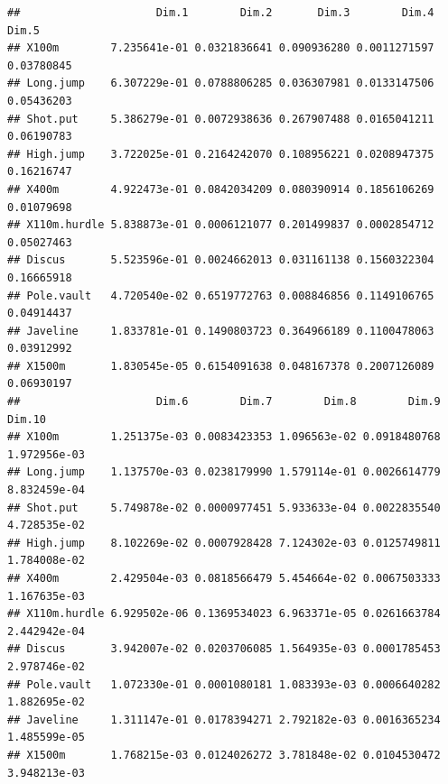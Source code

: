 \documentclass[
]{book}
\newenvironment{Shaded}{\begin{snugshade}}{\end{snugshade}}
\newcommand{\CommentTok}[1]{\textcolor[rgb]{0.56,0.35,0.01}{\textit{#1}}}
\newcommand{\FunctionTok}[1]{\textcolor[rgb]{0.13,0.29,0.53}{\textbf{#1}}}
\newcommand{\NormalTok}[1]{#1}
\newcommand{\OtherTok}[1]{\textcolor[rgb]{0.56,0.35,0.01}{#1}}
\newcommand{\SpecialCharTok}[1]{\textcolor[rgb]{0.81,0.36,0.00}{\textbf{#1}}}
\begin{document}
\begin{verbatim}
##                     Dim.1        Dim.2       Dim.3        Dim.4      Dim.5
## X100m        7.235641e-01 0.0321836641 0.090936280 0.0011271597 0.03780845
## Long.jump    6.307229e-01 0.0788806285 0.036307981 0.0133147506 0.05436203
## Shot.put     5.386279e-01 0.0072938636 0.267907488 0.0165041211 0.06190783
## High.jump    3.722025e-01 0.2164242070 0.108956221 0.0208947375 0.16216747
## X400m        4.922473e-01 0.0842034209 0.080390914 0.1856106269 0.01079698
## X110m.hurdle 5.838873e-01 0.0006121077 0.201499837 0.0002854712 0.05027463
## Discus       5.523596e-01 0.0024662013 0.031161138 0.1560322304 0.16665918
## Pole.vault   4.720540e-02 0.6519772763 0.008846856 0.1149106765 0.04914437
## Javeline     1.833781e-01 0.1490803723 0.364966189 0.1100478063 0.03912992
## X1500m       1.830545e-05 0.6154091638 0.048167378 0.2007126089 0.06930197
##                     Dim.6        Dim.7        Dim.8        Dim.9       Dim.10
## X100m        1.251375e-03 0.0083423353 1.096563e-02 0.0918480768 1.972956e-03
## Long.jump    1.137570e-03 0.0238179990 1.579114e-01 0.0026614779 8.832459e-04
## Shot.put     5.749878e-02 0.0000977451 5.933633e-04 0.0022835540 4.728535e-02
## High.jump    8.102269e-02 0.0007928428 7.124302e-03 0.0125749811 1.784008e-02
## X400m        2.429504e-03 0.0818566479 5.454664e-02 0.0067503333 1.167635e-03
## X110m.hurdle 6.929502e-06 0.1369534023 6.963371e-05 0.0261663784 2.442942e-04
## Discus       3.942007e-02 0.0203706085 1.564935e-03 0.0001785453 2.978746e-02
## Pole.vault   1.072330e-01 0.0001080181 1.083393e-03 0.0006640282 1.882695e-02
## Javeline     1.311147e-01 0.0178394271 2.792182e-03 0.0016365234 1.485599e-05
## X1500m       1.768215e-03 0.0124026272 3.781848e-02 0.0104530472 3.948213e-03
\end{verbatim}

\begin{Shaded}
\end{Shaded}
\end{document}
